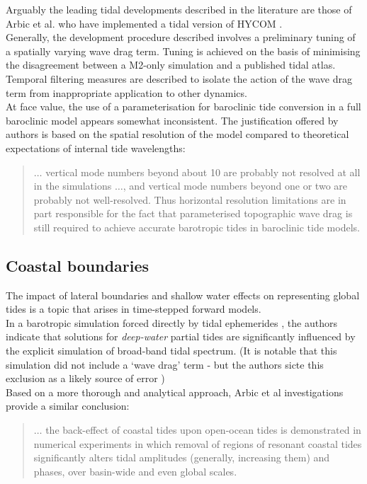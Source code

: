 Arguably the leading tidal \OGCM{} developments described in the literature are those of Arbic et al. who have implemented a tidal version of HYCOM \cite{Arbic:2005gv,Arbic:2009hf,Arbic:2010us,Arbic:hy}.\\
Generally, the development procedure described involves a preliminary tuning of a spatially varying wave drag term.  Tuning is achieved on the basis of minimising the disagreement between a M2-only simulation and a published tidal atlas.   
Temporal filtering measures are described to isolate the action of the wave drag term from inappropriate application to other dynamics.  \\
At face value, the use of a parameterisation for baroclinic tide conversion in a full baroclinic model appears somewhat inconsistent.   The justification offered by authors is based on the spatial resolution of the model compared to theoretical expectations of internal tide wavelengths:
\noindent \begin{quotation}
$\dots{}$  vertical mode numbers beyond about 10 are probably not resolved at all in the simulations $\dots{}$, and vertical mode numbers beyond one or two are probably not well-resolved. Thus horizontal resolution limitations are in part responsible for the fact that parameterised topographic wave drag is still required to achieve accurate barotropic tides in baroclinic tide models. \citep[pp177]{Arbic:2010us}
\end{quotation}



\subsection{Coastal boundaries}

The impact of lateral boundaries and shallow water effects on representing global tides is a topic that arises in time-stepped forward models.\\
In a barotropic simulation forced directly by tidal ephemerides \cite{Weis:2008ex}, the authors indicate that solutions for \emph{deep-water} partial tides are significantly influenced by the explicit simulation of broad-band tidal spectrum.   
(It is notable that this simulation did not include a `wave drag' term - but the authors sicte this exclusion as a likely source of error \citep[pp5]{Weis:2008ex})\\
Based on a more thorough and analytical approach, Arbic et al investigations provide a similar conclusion:
\noindent \begin{quotation}
$\dots{}$ the back-effect of coastal tides upon open-ocean tides is demonstrated in numerical experiments in which removal of regions of resonant coastal tides significantly alters tidal amplitudes (generally, increasing them) and phases, over basin-wide and even global scales.\citep[pp263]{Arbic:2009in}
\end{quotation}

